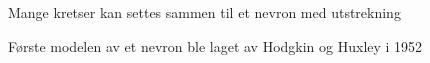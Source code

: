 \documentclass[presentation]{beamer}
\begin{document}
\begin{frame}{Mange kretser kan settes sammen til et nevron med utstrekning}
   \begin{figure}
\end{figure}
\end{frame}


\begin{frame}{Første modelen av et nevron ble laget av Hodgkin og Huxley i 1952}
   \begin{figure}
\end{figure}
\end{frame}
\end{document}

